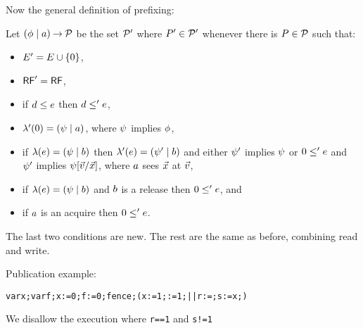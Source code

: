 Now the general definition of prefixing:

Let $(\phi \mid a) \mathbin\rightarrow \mathcal{P}$ be the set $\mathcal{P}'$ where
$P'\in\mathcal{P}'$ whenever there is $P\in\mathcal{P}$ such that:
\begin{itemize}
\item $E' = E \cup \{0\}$,
\item $\mathsf{RF}' = \mathsf{RF}$,
\item if $d \le e$ then $d \le' e$,
\item $\lambda'(0) = (\psi \mid a)$, where $\psi$ implies $\phi$, 
\item if $\lambda(e) = (\psi \mid b)$ then
  $\lambda'(e) = (\psi' \mid b)$ and either $\psi'$ implies
  $\psi$ or
  $0 \le' e$ and $\psi'$ implies $\psi[\vec{v}/\vec{x}]$,
  where $a$ sees $\vec{x}$ at $\vec{v}$,
\item if $\lambda(e) = (\psi \mid b)$ and $b$ is a release then $0
  \le' e$, and
\item if $a$ is an acquire then $0 \le' e$.  
\end{itemize}
The last two conditions are new.  The rest are the same as before, combining
read and write.   



Publication example:
\begin{alltt}
    var x; var f; x:=0; f:=0; fence; (x:=1; :=1;  ||  r:=; s:=x;)
\end{alltt}
We disallow the execution where \texttt{r==1} and \texttt{s!=1}

